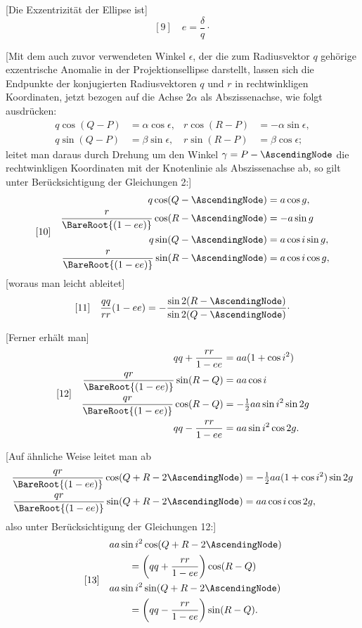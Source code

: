 [Die Exzentrizität der Ellipse ist]
\[
[9]\quad e=\frac{\delta}{q}\mathpunct{\cdot}
\]

[Mit dem auch zuvor verwendeten Winkel \(\epsilon\), der die zum Radiusvektor \(q\) gehörige exzentrische Anomalie in der Projektionsellipse darstellt, lassen sich die Endpunkte der konjugierten Radiusvektoren \(q\) und \(r\) in rechtwinkligen Koordinaten, jetzt bezogen auf die Achse \(2\alpha\) als Abszissenachse, wie folgt ausdrücken:
\[
\begin{aligned}
q\cos(Q-P)&=\alpha\cos\epsilon,&
r\cos(R-P)&=-\alpha\sin\epsilon,\\
q\sin(Q-P)&=\beta\sin\epsilon,&
r\sin(R-P)&=\beta\cos\epsilon;
\end{aligned}
\]
leitet man daraus durch Drehung um den Winkel \(\gamma=P-\AscendingNode\) die rechtwinkligen Koordinaten mit der Knotenlinie als Abszissenachse ab, so gilt unter Berücksichtigung der Gleichungen 2:]
\[
[10]\quad\begin{aligned}
q\cos(Q-\AscendingNode)&=a\cos g,\\
\frac{r}{\BareRoot{(1-ee)}}\cos(R-\AscendingNode)&=-a\sin g\\
q\sin(Q-\AscendingNode)&=a\cos i\sin g,\\
\frac{r}{\BareRoot{(1-ee)}}\sin(R-\AscendingNode)&=a\cos i\cos g,
\end{aligned}
\]
[woraus man leicht ableitet]
\[
[11]\quad\frac{qq}{rr}(1-ee)
=-\frac{\sin2(R-\AscendingNode)}{\sin2(Q-\AscendingNode)}\mathpunct{\cdot}
\]

[Ferner erhält man]
\[
[12]\quad\begin{aligned}
qq+\frac{rr}{1-ee}&=aa(1+\cos i^2)\\
\frac{qr}{\BareRoot{(1-ee)}}\sin(R-Q)&=aa\cos i\\
\frac{qr}{\BareRoot{(1-ee)}}\cos(R-Q)&=-\tfrac{1}{2}aa\sin i^2\sin2g\\
qq-\frac{rr}{1-ee}&=aa\sin i^2\cos2g.
\end{aligned}
\]

[Auf ähnliche Weise leitet man ab
\[
\begin{aligned}
\frac{qr}{\BareRoot{(1-ee)}}\cos(Q+R-2\AscendingNode)
&=-\tfrac{1}{2}aa(1+\cos i^2)\sin2g\\
\frac{qr}{\BareRoot{(1-ee)}}\sin(Q+R-2\AscendingNode)
&=aa\cos i\cos2g,
\end{aligned}
\]
also unter Berücksichtigung der Gleichungen 12:]
\[
[13]\quad\begin{aligned}
&aa\sin i^2\cos(Q+R-2\AscendingNode)\\
&\qquad=\left(qq+\frac{rr}{1-ee}\right)\cos(R-Q)\\
&aa\sin i^2\sin(Q+R-2\AscendingNode)\\
&\qquad=\left(qq-\frac{rr}{1-ee}\right)\sin(R-Q).
\end{aligned}
\]

